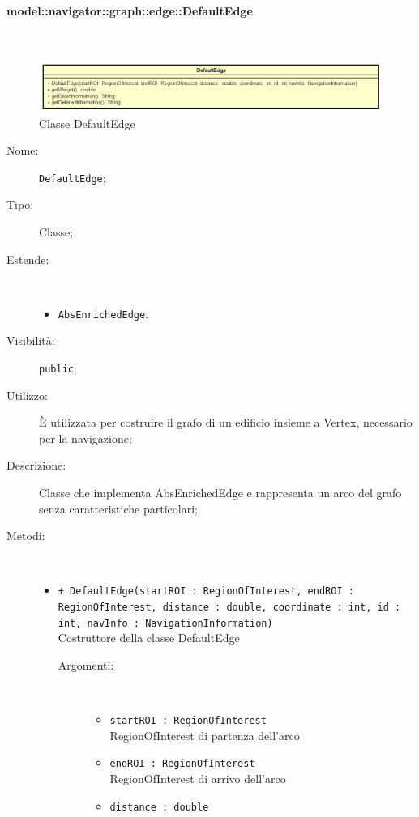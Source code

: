 \documentclass[../DefinizioneDiProdotto.tex]{subfiles}
\begin{document}
\paragraph{model::navigator::graph::edge::DefaultEdge}
\
\begin{figure}[H]
	\centering
	\includegraphics[width=\maxwidth]{img/DefaultEdge.png}
	\caption{Classe DefaultEdge}\label{fig:model::navigator::graph::edge::DefaultEdge} 
\end{figure}
\begin{description}
	\item[Nome:] \texttt{DefaultEdge};
	\item[Tipo:] Classe;
	\item[Estende:] \
	\begin{itemize}
		\item \texttt{AbsEnrichedEdge}.
	\end{itemize}
	\item[Visibilità:] \texttt{public};
	\item[Utilizzo:] È utilizzata per costruire il grafo di un edificio insieme a Vertex, necessario per la navigazione;
	\item[Descrizione:] Classe che implementa AbsEnrichedEdge e rappresenta un arco del grafo senza caratteristiche particolari;
	\item[Metodi:] \
	\begin{itemize}
		\item \texttt{+ DefaultEdge(startROI : RegionOfInterest, endROI : RegionOfInterest, distance : double, coordinate : int, id : int, navInfo : NavigationInformation)}\\
		Costruttore della classe DefaultEdge
		\begin{description}
			\item[Argomenti:] \
			\begin{itemize}
				\item \texttt{startROI : RegionOfInterest}\\
				RegionOfInterest di partenza dell'arco\item \texttt{endROI : RegionOfInterest}\\
				RegionOfInterest di arrivo dell'arco\item \texttt{distance : double}\\

\end{itemize}
\end{description}
\end{itemize}
\end{description}
\end{document}
